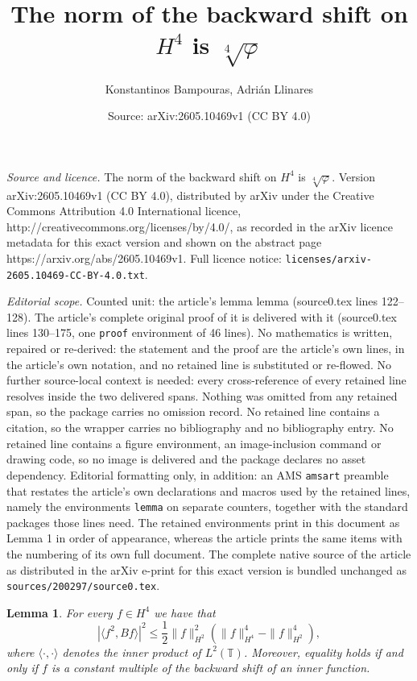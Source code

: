 \documentclass[10pt,a4paper]{amsart}
\title{The norm of the backward shift on $H^4$ is $\sqrt[4]{\varphi}$}
\author{Konstantinos Bampouras, Adri\'an Llinares}
\date{Source: arXiv:2605.10469v1 (CC BY 4.0)}
\newtheorem{lemma}{Lemma}
\newcommand{\T}{\mathbb{T}}
\begin{document}
\maketitle

\noindent\emph{Source and licence.} The norm of the backward shift on $H^4$ is $\sqrt[4]{\varphi}$. Version arXiv:2605.10469v1 (CC BY 4.0), distributed by arXiv under the Creative Commons Attribution 4.0 International licence, http://creativecommons.org/licenses/by/4.0/, as recorded in the arXiv licence metadata for this exact version and shown on the abstract page https://arxiv.org/abs/2605.10469v1. Full licence notice: \texttt{licenses/arxiv-2605.10469-CC-BY-4.0.txt}.\par\smallskip

\noindent\textit{Editorial scope.} Counted unit: the article's lemma lemma (source0.tex lines 122--128). The article's complete original proof of it is delivered with it (source0.tex lines 130--175, one \texttt{proof} environment of 46 lines). No mathematics is written, repaired or re-derived: the statement and the proof are the article's own lines, in the article's own notation, and no retained line is substituted or re-flowed.  No further source-local context is needed: every cross-reference of every retained line resolves inside the two delivered spans.  Nothing was omitted from any retained span, so the package carries no omission record.  No retained line contains a citation, so the wrapper carries no bibliography and no bibliography entry.  No retained line contains a figure environment, an image-inclusion command or drawing code, so no image is delivered and the package declares no asset dependency.  Editorial formatting only, in addition: an AMS \texttt{amsart} preamble that restates the article's own declarations and macros used by the retained lines, namely the environments \texttt{lemma} on separate counters, together with the standard packages those lines need.  The retained environments print in this document as Lemma 1 in order of appearance, whereas the article prints the same items with the numbering of its own full document.  The complete native source of the article as distributed in the arXiv e-print for this exact version is bundled unchanged as \texttt{sources/200297/source0.tex}.
        \begin{lemma}\label{lemma}
            For every $f \in H^4$ we have that
            \begin{equation} \label{eqn:CubicBound}
                |\langle f^2, Bf \rangle|^2 \leq \dfrac{1}{2} \| f \|_{H^2}^2 ( \| f \|_{H^4}^4-\|f\|_{H^2}^4 ),
            \end{equation}
            where $\langle \cdot, \cdot \rangle$ denotes the inner product of $L^2 (\T)$. Moreover, equality holds if and only if $f$ is a constant multiple of the backward shift of an inner function.
        \end{lemma}
\end{document}
